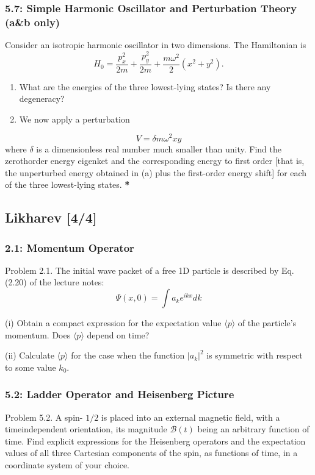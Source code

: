 \documentclass[11pt]{article}
\begin{document}
\subsubsection{5.7: Simple Harmonic Oscillator and Perturbation Theory (a\&b only)}
\label{sec:orgb7d3e94}
Consider an isotropic harmonic oscillator in two dimensions. The Hamiltonian is
$$ H_0=\frac{p_x^2}{2 m}+\frac{p_y^2}{2 m}+\frac{m
\omega^2}{2}\left(x^2+y^2\right) . $$
\begin{enumerate}
\item What are the energies of the three lowest-lying states? Is there any
degeneracy?
\item We now apply a perturbation
\end{enumerate}
$$ V=\delta m \omega^2 x y $$ where \(\delta\) is a dimensionless real number much
smaller than unity. Find the zerothorder energy eigenket and the corresponding
energy to first order [that is, the unperturbed energy obtained in (a) plus the
first-order energy shift] for each of the three lowest-lying states.
\textbf{*}
\subsection{Likharev [4/4]}
\label{sec:orgd696cc1}
\subsubsection{2.1: Momentum Operator}
\label{sec:org7eca7a7}
Problem 2.1. The initial wave packet of a free 1D particle is described by Eq. (2.20) of the lecture notes:
$$
\Psi(x, 0)=\int a_k e^{i k x} d k
$$

(i) Obtain a compact expression for the expectation value \(\langle p\rangle\) of the
particle's momentum. Does \(\langle p\rangle\) depend on time?

(ii) Calculate \(\langle p\rangle\) for the case when the function \(\left|a_k\right|^2\) is
symmetric with respect to some value \(k_0\).
\subsubsection{5.2: Ladder Operator and Heisenberg Picture}
\label{sec:org0a06783}
Problem 5.2. A spin- \(1 / 2\) is placed into an external magnetic field, with a
timeindependent orientation, its magnitude \(\mathscr{B}(t)\) being an arbitrary
function of time. Find explicit expressions for the Heisenberg operators and the
expectation values of all three Cartesian components of the spin, as functions
of time, in a coordinate system of your choice.
\end{document}
